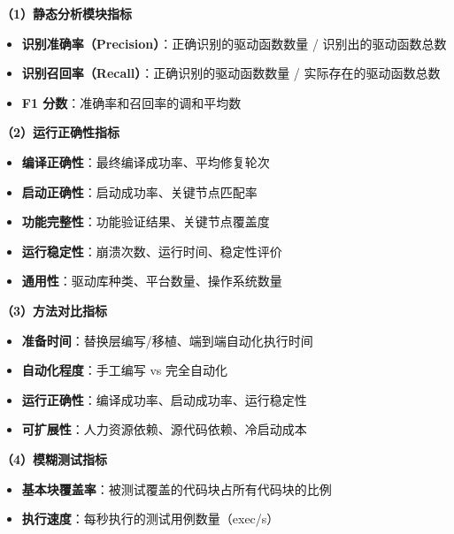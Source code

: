 \textbf{（1）静态分析模块指标}

\begin{itemize}
    \item \textbf{识别准确率（Precision）}：正确识别的驱动函数数量 / 识别出的驱动函数总数
    \item \textbf{识别召回率（Recall）}：正确识别的驱动函数数量 / 实际存在的驱动函数总数
    \item \textbf{F1 分数}：准确率和召回率的调和平均数
\end{itemize}

\textbf{（2）运行正确性指标}

\begin{itemize}
    \item \textbf{编译正确性}：最终编译成功率、平均修复轮次
    \item \textbf{启动正确性}：启动成功率、关键节点匹配率
    \item \textbf{功能完整性}：功能验证结果、关键节点覆盖度
    \item \textbf{运行稳定性}：崩溃次数、运行时间、稳定性评价
    \item \textbf{通用性}：驱动库种类、平台数量、操作系统数量
\end{itemize}

\textbf{（3）方法对比指标}

\begin{itemize}
    \item \textbf{准备时间}：替换层编写/移植、端到端自动化执行时间
    \item \textbf{自动化程度}：手工编写 vs 完全自动化
    \item \textbf{运行正确性}：编译成功率、启动成功率、运行稳定性
    \item \textbf{可扩展性}：人力资源依赖、源代码依赖、冷启动成本
\end{itemize}

\textbf{（4）模糊测试指标}

\begin{itemize}
    \item \textbf{基本块覆盖率}：被测试覆盖的代码块占所有代码块的比例
    \item \textbf{执行速度}：每秒执行的测试用例数量（exec/s）
\end{itemize}
